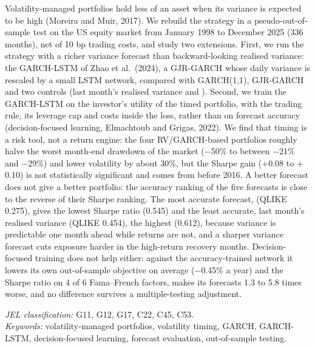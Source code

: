 \documentclass[12pt]{article}
\begin{document}
\begin{singlespace}\small
\noindent Volatility-managed portfolios hold less of an asset when its variance is expected to be high (Moreira and Muir, 2017). We rebuild the strategy in a pseudo-out-of-sample test on the US equity market from January 1998 to December 2025 (336 months), net of 10 bp trading costs, and study two extensions. First, we run the strategy with a richer variance forecast than backward-looking realised variance: the GARCH-LSTM of Zhao et al.\ (2024), a GJR-GARCH whose daily variance is rescaled by a small LSTM network, compared with GARCH(1,1), GJR-GARCH and two controls (last month's realised variance and \VIX). Second, we train the GARCH-LSTM on the investor's utility of the timed portfolio, with the trading rule, its leverage cap and costs inside the loss, rather than on forecast accuracy (decision-focused learning, Elmachtoub and Grigas, 2022). We find that timing is a risk tool, not a return engine: the four RV/GARCH-based portfolios roughly halve the worst month-end drawdown of the market ($-$50\% to between $-$21\% and $-$29\%) and lower volatility by about 30\%, but the Sharpe gain ($+$0.08 to $+$0.10) is not statistically significant and comes from before 2016. A better forecast does not give a better portfolio: the accuracy ranking of the five forecasts is close to the reverse of their Sharpe ranking. The most accurate forecast, \VIX{} (QLIKE 0.275), gives the lowest Sharpe ratio (0.545) and the least accurate, last month's realised variance (QLIKE 0.454), the highest (0.612), because variance is predictable one month ahead while returns are not, and a sharper variance forecast cuts exposure harder in the high-return recovery months. Decision-focused training does not help either: against the accuracy-trained network it lowers its own out-of-sample objective on average ($-$0.45\% a year) and the Sharpe ratio on 4 of 6 Fama--French factors, makes its forecasts 1.3 to 5.8 times worse, and no difference survives a multiple-testing adjustment.
\end{singlespace}
\vspace{0.8em}
\begin{singlespace}\small
\noindent\textit{JEL classification:} G11, G12, G17, C22, C45, C53.\\[2pt]
\noindent\textit{Keywords:} volatility-managed portfolios, volatility timing, GARCH, GARCH-LSTM, decision-focused learning, forecast evaluation, out-of-sample testing.
\end{singlespace}
\clearpage
\end{document}
